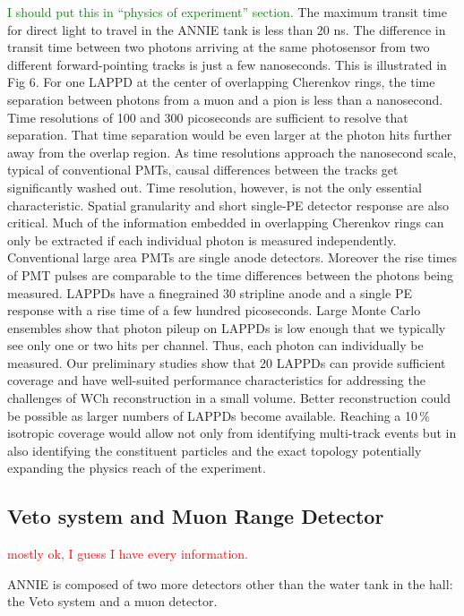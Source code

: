  {\textcolor{green}{I should put this in ``physics of experiment'' section.}
 \color{blue}
 The maximum transit time for direct light to travel in the ANNIE tank is less than 20 ns.
 The difference in transit time between two photons arriving at the same photosensor from two %
 different forward-pointing tracks is just a few nanoseconds. 
 This is illustrated in Fig 6. 
 For one LAPPD at the center of overlapping Cherenkov rings, the time separation between photons %
 from a muon and a pion is less than a nanosecond. 
 Time resolutions of 100 and 300 picoseconds are sufficient to resolve that separation. 
 That time separation would be even larger at the photon hits further away from the overlap region. 
 As time resolutions approach the nanosecond scale, typical of conventional PMTs, %
 causal differences between the tracks get significantly washed out.
 Time resolution, however, is not the only essential characteristic. 
 Spatial granularity and short single-PE detector response are also critical.
 Much of the information embedded in overlapping Cherenkov rings can only be extracted %
 if each individual photon is measured independently.
 Conventional large area PMTs are single anode detectors. 
 Moreover the rise times of PMT pulses are comparable to the time differences between %
 the photons being measured. 
 LAPPDs have a finegrained 30 stripline anode and a single PE response with a rise time %
 of a few hundred picoseconds.
 Large Monte Carlo ensembles show that photon pileup on LAPPDs is low enough that we typically %
 see only one or two hits per channel. 
 Thus, each photon can individually be measured.
 Our preliminary studies show that 20 LAPPDs can provide sufficient coverage and have well-suited %
 performance characteristics for addressing the challenges of WCh reconstruction in a small volume. 
 Better reconstruction could be possible as larger numbers of LAPPDs become available.
 Reaching a 10\,\% isotropic coverage would allow not only from identifying multi-track %
 events but in also identifying the constituent particles and the exact topology potentially %
 expanding the physics reach of the experiment.}

 \subsection[Veto and MRD]{Veto system and Muon Range Detector}
 \label{2.3}
 \textcolor{red}{mostly ok, I guess I have every information.}

 ANNIE is composed of two more detectors other than the water tank in the hall: the Veto system %
 and a muon detector.

